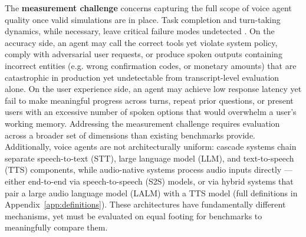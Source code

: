 The \textbf{measurement challenge} concerns capturing the full scope of voice agent quality once valid simulations are in place. Task completion and turn-taking dynamics, while necessary, leave critical failure modes undetected \cite{cao2026beyond, mehta2025beyond, andres2025testing}. On the accuracy side, an agent may call the correct tools yet violate system policy, comply with adversarial user requests, or produce spoken outputs containing incorrect entities (e.g. wrong confirmation codes, or monetary amounts) that are catastrophic in production yet undetectable from transcript-level evaluation alone. On the user experience side, an agent may achieve low response latency yet fail to make meaningful progress across turns, repeat prior questions, or present users with an excessive number of spoken options that would overwhelm a user's working memory. Addressing the measurement challenge requires evaluation across a broader set of dimensions than existing benchmarks provide. Additionally, voice agents are not architecturally uniform: cascade systems chain separate speech-to-text (STT), large language model (LLM), and text-to-speech (TTS) components, while audio-native systems process audio inputs directly — either end-to-end via speech-to-speech (S2S) models, or via hybrid systems that pair a large audio language model (LALM) with a TTS model (full definitions in Appendix~\ref{app:definitions}). These architectures have fundamentally different mechanisms, yet must be evaluated on equal footing for benchmarks to meaningfully compare them.


